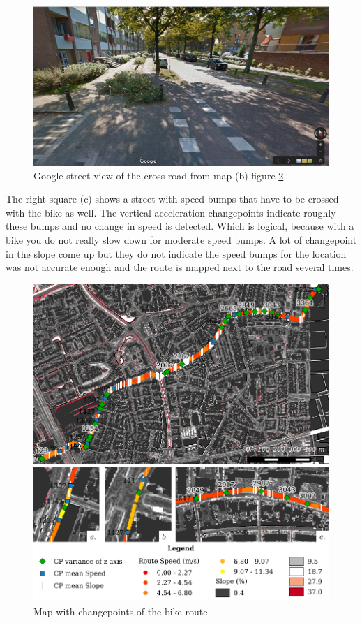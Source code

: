 \begin{figure}[hb]
\includegraphics[width=\textwidth]{img/R_crossroad.png}
\centering
\caption{Google street-view of the cross road from map (b) figure \ref{routeB2}. \label{crossroad}}
\end{figure} 


The right square (c) shows a street with speed bumps that have to be crossed with the bike as well. The vertical acceleration changepoints indicate roughly these bumps and no change in speed is detected. Which is logical, because with a bike you do not really slow down for moderate speed bumps. A lot of changepoint in the slope come up but they do not indicate the speed bumps for the location was not accurate enough and the route is mapped next to the road several times. 



\begin{figure}[hb]
\includegraphics[width=\textwidth]{img/R_Bikeroute.pdf}
\centering
\caption{Map with changepoints of the bike route.\label{routeB2}}
\end{figure} 

